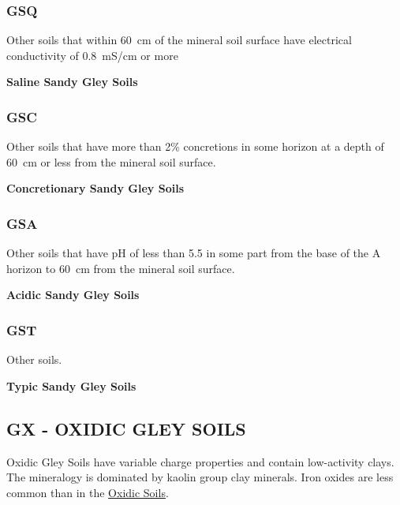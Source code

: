 \documentclass[
  letterpaper,
  DIV=11,
  numbers=noendperiod]{scrreprt}
\begin{document}
\hypertarget{sec-key-GSQ}{%
\subsubsection{\texorpdfstring{\textbf{GSQ}}{GSQ}}\label{sec-key-GSQ}}

Other soils that within 60~cm of the mineral soil surface have
electrical conductivity of 0.8~mS/cm or more

\textbf{Saline Sandy Gley Soils}

\hypertarget{sec-key-GSC}{%
\subsubsection{\texorpdfstring{\textbf{GSC}}{GSC}}\label{sec-key-GSC}}

Other soils that have more than 2\% concretions in some horizon at a
depth of 60~cm or less from the mineral soil surface.

\textbf{Concretionary Sandy Gley Soils}

\hypertarget{sec-key-GSA}{%
\subsubsection{\texorpdfstring{\textbf{GSA}}{GSA}}\label{sec-key-GSA}}

Other soils that have pH of less than 5.5 in some part from the base of
the A horizon to 60~cm from the mineral soil surface.

\textbf{Acidic Sandy Gley Soils}

\hypertarget{sec-key-GST}{%
\subsubsection{\texorpdfstring{\textbf{GST}}{GST}}\label{sec-key-GST}}

Other soils.

\textbf{Typic Sandy Gley Soils}

\hypertarget{sec-GX}{%
\subsection{\texorpdfstring{\textbf{GX} - OXIDIC GLEY
SOILS}{GX - OXIDIC GLEY SOILS}}\label{sec-GX}}

Oxidic Gley Soils have variable charge properties and contain
low-activity clays. The mineralogy is dominated by kaolin group clay
minerals. Iron oxides are less common than in the
\protect\hyperlink{sec-X}{Oxidic Soils}.
\end{document}
